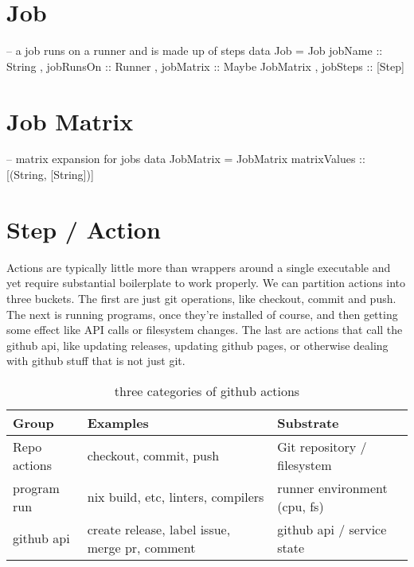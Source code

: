 \documentclass[openany, 12pt]{book}
\begin{document}
\chapter{Job}

\begin{haskell}{}
-- a job runs on a runner and is made up of steps
data Job = Job
  { jobName   :: String
  , jobRunsOn :: Runner
  , jobMatrix :: Maybe JobMatrix
  , jobSteps  :: [Step]
  }
\end{haskell}

\chapter{Job Matrix}
\begin{haskell}{}
-- matrix expansion for jobs
data JobMatrix = JobMatrix
  { matrixValues :: [(String, [String])]
  }
\end{haskell}

\chapter{Step / Action}
Actions are typically little more than wrappers around a single executable and
yet require substantial boilerplate to work properly. We can partition actions
into three buckets. The first are just git operations, like checkout, commit and
push.  The next is running programs, once they're installed of course, and then
getting some effect like API calls or filesystem changes. The last are actions
that call the github api, like updating releases, updating github pages, or
otherwise dealing with github stuff that is not just git.

\begin{table}[h]
	\centering
	\begin{tabular}{lll}
		\toprule
		\textbf{Group} & \textbf{Examples}                              & \textbf{Substrate}           \\
		\midrule
		Repo actions   & checkout, commit, push                         & Git repository / filesystem  \\
		program run    & nix build, etc, linters, compilers             & runner environment (cpu, fs) \\
		github api     & create release, label issue, merge pr, comment & github api / service state   \\
		\bottomrule
	\end{tabular}
	\caption{three categories of github actions}
\end{table}
\end{document}
